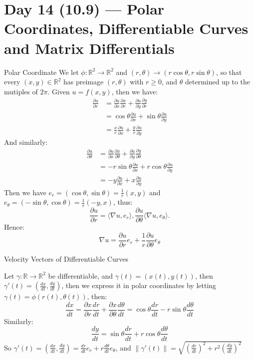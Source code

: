 \documentclass[11pt]{article}
\newenvironment{example}[1]{\begin{exbox}{#1}{}}{\end{exbox}}
\theoremstyle{quiet}
\theoremstyle{quietremark}
\begin{document}
\section{Day 14 (10.9) --- Polar Coordinates, Differentiable Curves and Matrix Differentials}
\begin{example}{Polar Coordinate}
We let $\phi:\mathbb{R}^2\to\mathbb{R}^2$ and $(r,\theta)\to(r\cos\theta,r\sin\theta)$, so that every $(x,y)\in\mathbb{R}^2$ has preimage $(r,\theta)$ with $r\ge 0$, and $\theta$ determined up to the mutiples of $2\pi$. Given $u=f(x,y)$, then we have:
\[
\begin{aligned}
\frac{\partial u}{\partial r}
&=\frac{\partial u}{\partial x}\frac{\partial x}{\partial r}+\frac{\partial u}{\partial y}\frac{\partial y}{\partial r}\\
&=\cos\theta\frac{\partial u}{\partial x}+\sin \theta\frac{\partial u}{\partial y}\\
&=\frac{x}{r}\frac{\partial u}{\partial x}+\frac{y}{r}\frac{\partial u}{\partial y}
\end{aligned}
\]
And similarly:
\[
\begin{aligned}
\frac{\partial u}{\partial \theta}
&=\frac{\partial u}{\partial x}\frac{\partial x}{\partial \theta}+\frac{\partial u}{\partial y}\frac{\partial y}{\partial \theta}\\
&=-r\sin\theta\frac{\partial u}{\partial x}+r\cos \theta\frac{\partial u}{\partial y}\\
&=-y\frac{\partial u}{\partial x}+x\frac{\partial u}{\partial y}
\end{aligned}
\]
Then we have $\displaystyle e_r=(\cos\theta,\sin\theta)=\frac{1}{r}(x,y)$ and $\displaystyle e_\theta=(-\sin\theta,\cos\theta)=\frac{1}{r}(-y,x)$, thus:
\[
\frac{\partial u}{\partial r}=\langle\nabla u,e_r\rangle, \frac{\partial u}{\partial \theta}\langle\nabla u,e_\theta\rangle.
\]
Hence:
\[
\nabla u=\frac{\partial u}{\partial r}e_r+\frac{1}{r}\frac{\partial u}{\partial \theta}e_\theta
\]
\end{example}

\begin{example}{Velocity Vectors of Differentiable Curves}

Let $\gamma:\mathbb{R}\to\mathbb{R}^2$ be differentiable, and $\gamma(t)=(x(t),y(t))$, then $\gamma'(t)=(\frac{dx}{dt},\frac{dy}{dt})$, then we express it in polar coordinates by letting $\gamma(t)=\phi(r(t),\theta(t))$, then:
\[
\frac{dx}{dt}=\frac{\partial x}{\partial r}\frac{dr}{dt}+\frac{\partial x}{\partial \theta}{\frac{d\theta}{dt}}=\cos\theta\frac{dr}{dt}-r\sin\theta\frac{d\theta}{dt}
\]
Similarly:
\[
\frac{dy}{dt}=\sin\theta\frac{dr}{dt}+r\cos\theta\frac{d\theta}{dt}
\]
So $\gamma'(t)=(\frac{dx}{dt},\frac{dy}{dt})=\frac{dr}{dt}e_r+r\frac{d\theta}{dt}e_\theta$, and $\|\gamma'(t)\|=\sqrt{(\frac{dr}{dt})^2+r^2(\frac{dy}{dt})^2}$
\end{example}
\end{document}
